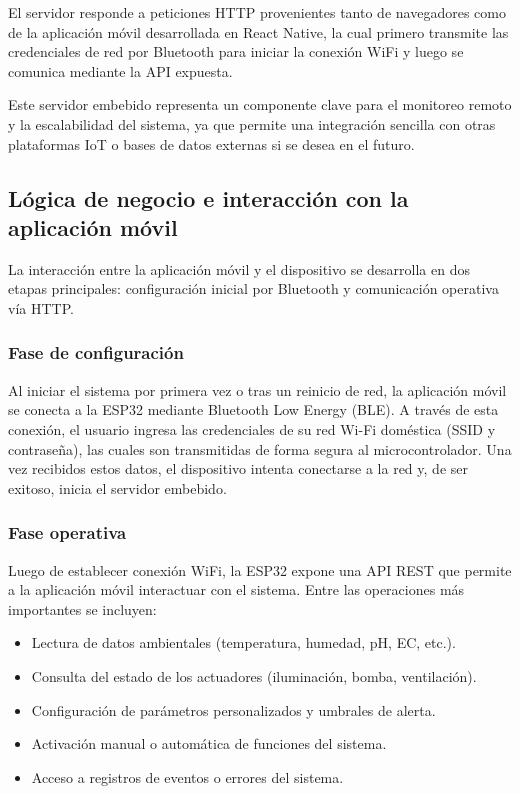 El servidor responde a peticiones HTTP provenientes tanto de navegadores como de la aplicación móvil desarrollada en React Native, la cual primero transmite las credenciales de red por Bluetooth para iniciar la conexión WiFi y luego se comunica mediante la API expuesta.

Este servidor embebido representa un componente clave para el monitoreo remoto y la escalabilidad del sistema, ya que permite una integración sencilla con otras plataformas IoT o bases de datos externas si se desea en el futuro.

\subsection{Lógica de negocio e interacción con la aplicación móvil}
La interacción entre la aplicación móvil y el dispositivo se desarrolla en dos etapas principales: configuración inicial por Bluetooth y comunicación operativa vía HTTP.

\subsubsection{Fase de configuración}
Al iniciar el sistema por primera vez o tras un reinicio de red, la aplicación móvil se conecta a la ESP32 mediante Bluetooth Low Energy (BLE). A través de esta conexión, el usuario ingresa las credenciales de su red Wi-Fi doméstica (SSID y contraseña), las cuales son transmitidas de forma segura al microcontrolador. Una vez recibidos estos datos, el dispositivo intenta conectarse a la red y, de ser exitoso, inicia el servidor embebido.

\subsubsection{Fase operativa}
Luego de establecer conexión WiFi, la ESP32 expone una API REST que permite a la aplicación móvil interactuar con el sistema. Entre las operaciones más importantes se incluyen:

\begin{itemize}
	\item Lectura de datos ambientales (temperatura, humedad, pH, EC, etc.).
	\item Consulta del estado de los actuadores (iluminación, bomba, ventilación).
	\item Configuración de parámetros personalizados y umbrales de alerta.
	\item Activación manual o automática de funciones del sistema.
	\item Acceso a registros de eventos o errores del sistema.
\end{itemize}

